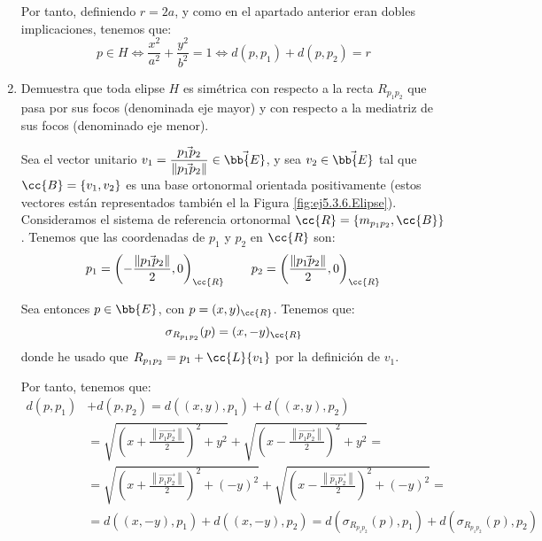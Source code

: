 \begin{ejercicio}
\begin{enumerate}
    Por tanto, definiendo $r=2a$, y como en el apartado anterior
    eran dobles implicaciones, tenemos que:
    \begin{equation*}
        p\in H \Longleftrightarrow \frac{x^2}{a^2} + \frac{y^2}{b^2} = 1
        \Longleftrightarrow d(p,p_1) + d(p,p_2) = r
    \end{equation*}

    \item Demuestra que toda elipse $H$ es simétrica con respecto a la recta $R_{p_1p_2}$ que pasa por sus focos (denominada eje mayor) y con respecto a la mediatriz de sus focos (denominado eje menor).
    
    Sea el vector unitario $v_1=\dfrac{\vec{p_1p_2}}{\left\|\vec{p_1p_2}\right\|}\in \vec{\bb{E}}$, y sea $v_2\in \vec{\bb{E}}$ tal que $\cc{B}=\{v_1,v_2\}$ es una base ortonormal orientada positivamente (estos vectores están representados también el la Figura \ref{fig:ej5.3.6.Elipse}).
    Consideramos el sistema de referencia ortonormal $\cc{R}=\{m_{p_1p_2},\cc{B}\}$. Tenemos que las coordenadas de $p_1$ y $p_2$ en $\cc{R}$ son:
    \begin{equation*}
        p_1 = \left(-\frac{\left\|\vec{p_1p_2}\right\|}{2}, 0\right)_{\cc{R}} \qquad
        p_2 = \left(\frac{\left\|\vec{p_1p_2}\right\|}{2}, 0\right)_{\cc{R}}
    \end{equation*}

    Sea entonces $p\in \bb{E}$, con $p=(x,y)_{\cc{R}}$. Tenemos que:
    \begin{equation*}
        \sigma_{R_{p_1p_2}}(p)= (x,-y)_{\cc{R}}
    \end{equation*}
    donde he usado que $R_{p_1p_2}=p_1+\cc{L}\{v_1\}$ por la definición de $v_1$.

    Por tanto, tenemos que:
    \begin{align*}
        d(p, p_1)& + d(p, p_2) = d((x,y), p_1) + d((x,y), p_2)\\&
        = \sqrt{\left(x+\frac{\left\|\vec{p_1p_2}\right\|}{2}\right)^2 + y^2} + \sqrt{\left(x-\frac{\left\|\vec{p_1p_2}\right\|}{2}\right)^2 + y^2} = \\&
        = \sqrt{\left(x+\frac{\left\|\vec{p_1p_2}\right\|}{2}\right)^2 + (-y)^2} + \sqrt{\left(x-\frac{\left\|\vec{p_1p_2}\right\|}{2}\right)^2 + (-y)^2} = \\ &
        = d((x,-y), p_1) + d((x,-y), p_2) = d(\sigma_{R_{p_1p_2}}(p), p_1) + d(\sigma_{R_{p_1p_2}}(p), p_2)
    \end{align*}


\end{enumerate}
\end{ejercicio}
